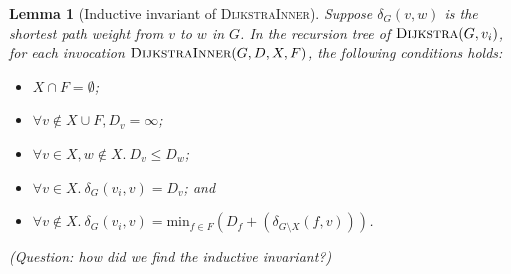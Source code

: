 \documentclass[11pt,a4paper,oneside,microtype,nokorean]{oblivoir}
\newtheorem{lemma}[theorem]{Lemma}
\begin{document}
\begin{lemma}[Inductive invariant of \textsc{DijkstraInner}] Suppose $\delta_G(v,w)$ is the shortest
  path weight from $v$ to $w$ in $G$.  In the recursion tree of $\textsc{Dijkstra}(G,v_i)$, for each
  invocation $\textsc{DijkstraInner}(G,D,X,F)$, the following conditions holds:
  \begin{itemize}
  \item $X \cap F = \emptyset$;
  \item $\forall v \notin X \cup F, D_v = \infty$;
  \item $\forall v\in X, w \notin X.~D_v \le D_w$;
  \item $\forall v \in X.~\delta_G(v_i,v) = D_v$; and
  \item
    $\forall v \notin X.~\delta_G(v_i,v) = \textrm{min}_{f \in F} (D_f + (\delta_{G \setminus
      X}(f,v)))$.
  \end{itemize}

  (Question: how did we find the inductive invariant?)
\end{lemma}
\end{document}
